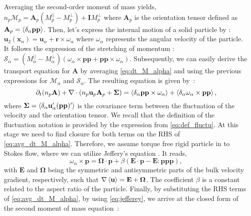 Averaging the second-order moment of mass yields, $n_p \mathcal{M}_p =  \textbf{A}_p (M_p^{||} - M_p^\bot) +  \textbf{I} M_p^\bot$ where $\textbf{A}_p$ is the orientation tensor defined as $\textbf{A}_p = \left<\delta_\alpha\textbf{pp}\right>$.
Then, let's express the internal motion of a solid particle by : $\textbf{u}_2(\textbf{x}_\alpha) = \textbf{u}_\alpha + \textbf{r}\times \omega_\alpha$ where $\omega_\alpha$ represents the angular velocity of the particle.
It follows the expression of the stretching of momentum : $\mathcal{S}_\alpha = (M_\alpha^{||} - M_\alpha^\bot) \left(
    \omega_\alpha \times
    \textbf{pp}
    + \textbf{pp} \times \omega_\alpha
\right)$. 
Subsequently,  we can easily derive the transport equation for $\textbf{A}$ by averaging \ref{eq:dt_M_alpha} and using the previous expressions for $\mathcal{M}_\alpha$ and $\mathcal{S}_\alpha$.
The resulting equation is given by~:
\begin{equation}
    \partial_t (n_p\textbf{A})
    + \mathbf{\nabla}\cdot (
        n_p\textbf{u}_p\textbf{A}_p
        + \mathbf{\Sigma}
        )
    =
    \left<\delta_\alpha \textbf{pp} \times \omega_\alpha\right>
    + \left<\delta_\alpha \omega_\alpha \times \textbf{pp}\right>,
    \label{eq:avg_dt_M_alpha}
\end{equation}
where $\mathbf{\Sigma} = \left<\delta_\alpha \textbf{u}'_\alpha(\textbf{pp})'\right>$ is the covariance term between the fluctuation of the velocity and the orientation tensor.
We recall that the definition of the fluctuation notation is provided by the expression from \ref{eq:def_fluctu}.
At this stage we need to find closure for both terms on the RHS of \ref{eq:avg_dt_M_alpha}. 
Therefore, we assume torque free rigid particle in to Stokes flow, where we can utilize Jeffery's equation \citep{guazzelli2011}.
It reads,
\begin{equation}
    \omega_\alpha \times \textbf{p}
    = \mathbf{\Omega}\cdot\textbf{p}
    + \beta\left(
        \textbf{E}\cdot \textbf{p}
        - \textbf{E} : \textbf{ppp}
    \right),
    \label{eq:jefferey}
\end{equation}
with $\textbf{E}$ and $\mathbf{\Omega}$ being the symmetric and antisymmetric parts of the bulk velocity gradient, respectively, such that $\mathbf{\nabla}\left<\textbf{u}\right>=\textbf{E}+\mathbf{\Omega}$.
The coefficient $\beta$  is a constant related to the aspect ratio of the particle.
Finally, by substituting the RHS terms of \ref{eq:avg_dt_M_alpha}, by using \ref{eq:jefferey}, we arrive at the closed form of the second moment of mass equation~:
